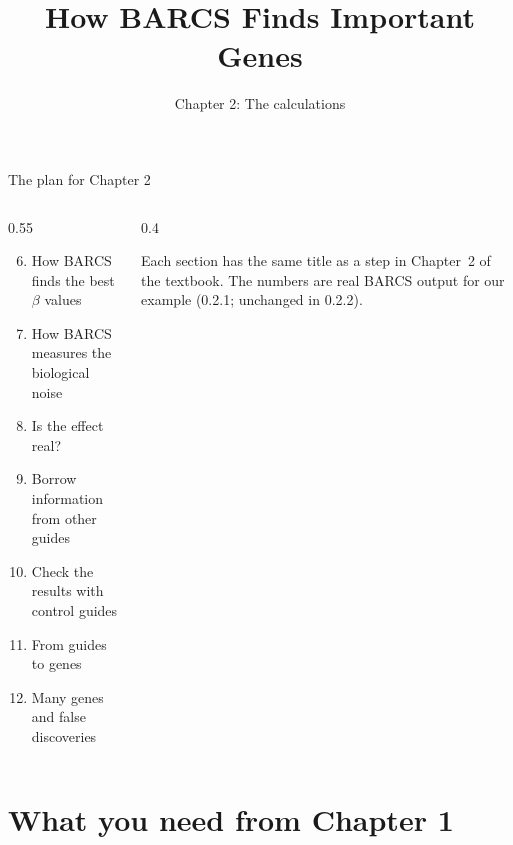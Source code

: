 \documentclass[aspectratio=169,11pt]{beamer}
\title{How BARCS Finds Important Genes}
\subtitle{Chapter 2: The calculations}
\begin{document}
\maketitle

\begin{frame}{The plan for Chapter 2}
\begin{columns}[T]
\begin{column}{0.55\textwidth}
\begin{enumerate}
\setcounter{enumi}{5}
\item[6.] How BARCS finds the best $\beta$ values
\item[7.] How BARCS measures the biological noise
\item[8.] Is the effect real?
\item[9.] Borrow information from other guides
\item[10.] Check the results with control guides
\item[11.] From guides to genes
\item[12.] Many genes and false discoveries
\end{enumerate}
\end{column}
\begin{column}{0.4\textwidth}
\begin{remember}
Each section has the same title as a step in Chapter~2 of the textbook. The
numbers are real BARCS output for our example (0.2.1; unchanged in 0.2.2).
\end{remember}
\end{column}
\end{columns}
\end{frame}

\section{What you need from Chapter 1}
\end{document}
